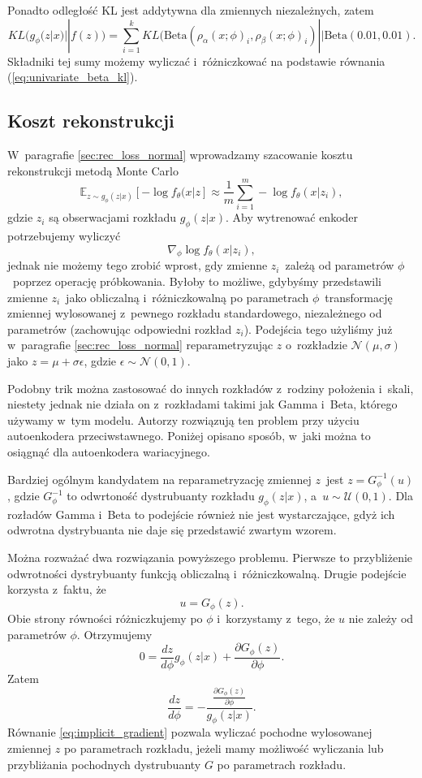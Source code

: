 \documentclass{iithesis}
\begin{document}
Ponadto odległość KL jest addytywna dla zmiennych niezależnych, zatem
\begin{equation*}
KL(g_\phi(z|x) || f(z)) = \sum_{i=1}^k
KL(\text{Beta}(\rho_\alpha(x;\phi)_i,\rho_\beta(x;\phi)_i) || \text{Beta}(0.01,0.01).
\end{equation*}
Składniki tej sumy możemy wyliczać i~różniczkować na podstawie równania (\ref{eq:univariate_beta_kl}).

\subsection{Koszt rekonstrukcji} \label{sec:rec_loss_beta}
W~paragrafie \ref{sec:rec_loss_normal} wprowadzamy szacowanie kosztu rekonstrukcji metodą Monte Carlo
$$
\mathbb{E}_{z\sim g_\phi(z|x)}\left[-\log f_\theta(x|z\right] \approx
\frac{1}{m} \sum_{i=1}^m -\log f_\theta(x|z_i),
$$
gdzie $z_i$ są obserwacjami rozkładu $g_\phi(z|x)$. Aby wytrenować enkoder potrzebujemy wyliczyć
$$
\nabla_\phi \log f_\theta(x|z_i),
$$
jednak nie możemy tego zrobić wprost, gdy zmienne $z_i$~zależą od parametrów $\phi$~poprzez
operację próbkowania. Byłoby to możliwe, gdybyśmy przedstawili zmienne $z_i$~jako
obliczalną i~różniczkowalną po parametrach $\phi$~transformację
zmiennej wylosowanej z~pewnego rozkładu standardowego, niezależnego od parametrów
(zachowując odpowiedni rozkład $z_i$). Podejścia tego użyliśmy już w~paragrafie \ref{sec:rec_loss_normal}
reparametryzując $z$ o~rozkładzie $\mathcal{N}(\mu, \sigma)$ jako $z=\mu + \sigma \epsilon$,
gdzie $\epsilon \sim \mathcal{N}(0, 1)$.

Podobny trik można zastosować do innych rozkładów z~rodziny położenia i~skali, niestety
jednak nie działa on z~rozkładami takimi jak Gamma i~Beta, którego używamy w~tym modelu.
Autorzy \cite{adversarial} rozwiązują ten problem przy użyciu autoenkodera przeciwstawnego.
Poniżej opisano sposób, w~jaki można to osiągnąć dla autoenkodera wariacyjnego.

Bardziej ogólnym kandydatem na reparametryzację zmiennej $z$~jest $z = G_\phi^{-1}(u)$,
gdzie $G_\phi^{-1}$ to odwrtoność dystrubuanty rozkładu $g_\phi(z|x)$, a~$u \sim \mathcal{U}(0, 1)$.
Dla rozładów Gamma i~Beta to podejście również nie jest wystarczające, gdyż
ich odwrotna dystrybuanta nie daje się przedstawić zwartym wzorem.

Można rozważać dwa rozwiązania powyższego problemu. Pierwsze to przybliżenie
odwrotności dystrybuanty funkcją obliczalną i~różniczkowalną.
Drugie podejście korzysta z~faktu, że
$$
u = G_\phi(z).
$$
Obie strony równości różniczkujemy po $\phi$ i~korzystamy z~tego, że $u$ nie zależy od parametrów $\phi$.
Otrzymujemy
$$
0 = \frac{dz}{d\phi}g_\phi(z|x)+\frac{\partial G_\phi(z)}{\partial \phi}.
$$
Zatem
\begin{equation} \label{eq:implicit_gradient}
\frac{dz}{d\phi} = -\frac{\frac{\partial G_\phi(z)}{\partial \phi}}{g_\phi(z|x)}.
\end{equation}
Równanie \ref{eq:implicit_gradient} pozwala wyliczać pochodne wylosowanej zmiennej $z$
po parametrach rozkładu, jeżeli mamy możliwość wyliczania lub przybliżania pochodnych
dystrubuanty $G$ po parametrach rozkładu.
\end{document}
